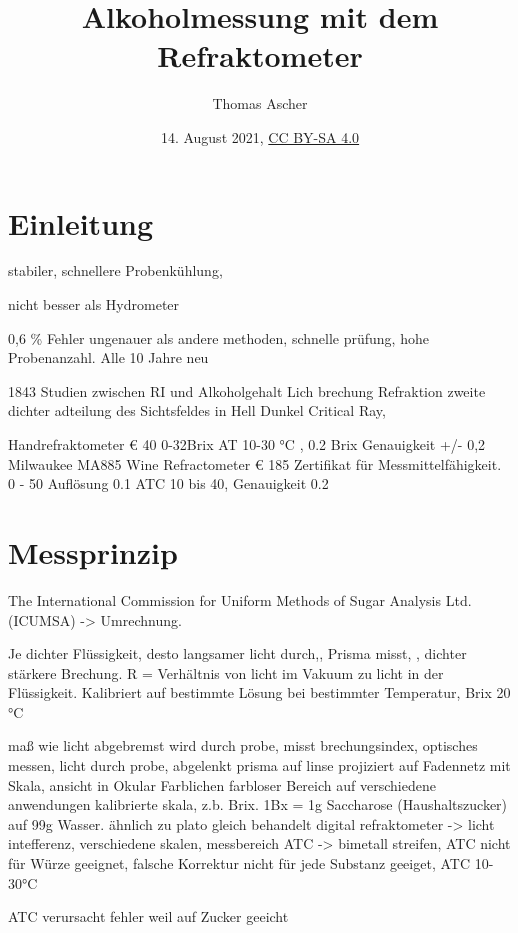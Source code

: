 \documentclass[a4paper,parskip=half]{scrartcl}
\title{Alkoholmessung mit dem Refraktometer}
\author{Thomas Ascher}
\date{14. August 2021, \href{http://creativecommons.org/licenses/by-sa/4.0/}{CC BY-SA 4.0}}
\begin{document}
\maketitle

\section*{Einleitung}

stabiler, schnellere Probenkühlung,
\autocite{Terrill2013}

nicht besser als Hydrometer
\autocite{Terrill2011}


0,6 \% Fehler ungenauer als andere methoden, schnelle prüfung,
hohe Probenanzahl. Alle 10 Jahre neu
\autocite{Bettner1969}

1843 Studien zwischen RI und Alkoholgehalt
Lich brechung Refraktion
zweite dichter adteilung des Sichtsfeldes in Hell Dunkel Critical Ray,

\autocite{Gamer1959}

Handrefraktometer € 40 0-32Brix AT 10-30 °C , 0.2 Brix Genauigkeit +/- 0,2
Milwaukee MA885 Wine Refractometer € 185
Zertifikat für Messmittelfähigkeit. 0 - 50 Auflösung 0.1
ATC 10 bis 40, Genauigkeit 0.2




\section*{Messprinzip}

The International Commission for Uniform Methods of Sugar Analysis  Ltd. (ICUMSA) -> Umrechnung.

Je dichter Flüssigkeit, desto langsamer licht durch,, Prisma misst, , dichter stärkere Brechung.  R = Verhältnis von licht im
Vakuum zu licht in der Flüssigkeit.
Kalibriert auf bestimmte Lösung bei bestimmter Temperatur,
Brix 20 °C
\autocite{Bonham2001}


maß wie licht abgebremst wird durch probe,
misst brechungsindex, optisches messen, licht durch probe, abgelenkt
prisma auf linse projiziert auf Fadennetz mit Skala, ansicht in Okular
Farblichen farbloser Bereich
auf verschiedene anwendungen kalibrierte skala, z.b. Brix.
1Bx = 1g Saccharose (Haushaltszucker) auf 99g Wasser. ähnlich zu plato
gleich behandelt
digital refraktometer -> licht intefferenz, verschiedene skalen, messbereich
ATC -> bimetall streifen, ATC nicht für Würze geeignet, falsche Korrektur
nicht für jede Substanz geeiget, ATC 10-30°C
\autocite{Terrill2013}

ATC verursacht fehler weil auf Zucker geeicht
\autocite{Terrill2010}
\end{document}
